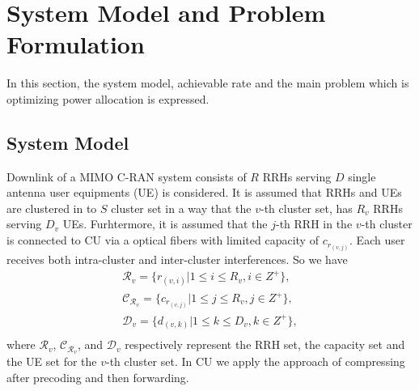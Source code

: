 \documentclass[conference,10pt,twocolumn,letter]{IEEEtran}
\begin{document}
\section{System Model and Problem Formulation}

In this section, the system model, achievable rate and the main problem which is optimizing power allocation is expressed.

\subsection{System Model}

Downlink of a MIMO C-RAN system consists of $R$ RRHs serving $D$ single antenna user equipments (UE) is considered. It is assumed that RRHs and UEs are clustered in to $S$ cluster set in a way that the $v$-th cluster set, has $R_v$ RRHs serving ${D}_v$ UEs. Furhtermore, it is assumed that the $j$-th RRH in the $v$-th cluster is connected to CU via a optical fibers with limited capacity of $c_{r_{(v,j)}}$. Each user receives both intra-cluster and inter-cluster interferences. So we have
\begin{equation}
\begin{split}
\mathcal{R}_v= \{  r_{(v,i)} | 1 \leq i \leq {R}_v , i\in Z^+\}, \\
\mathcal{C}_{\mathcal{R}_v}= \{c_{r_{(v,j)}}| 1 \leq j \leq {R}_v , j\in Z^+\}, \\
\mathcal{D}_v= \{  d_{(v,k)} | 1 \leq k \leq {D}_v , k\in Z^+\},  \\
\end{split}
\end{equation}
where $\mathcal{R}_v$, $\mathcal{C}_{\mathcal{R}_v}$, and $\mathcal{D}_v$ respectively represent the RRH set, the capacity set and the UE set  for the $v$-th cluster set.
In CU we apply the approach of compressing after precoding and then forwarding.
\end{document}
